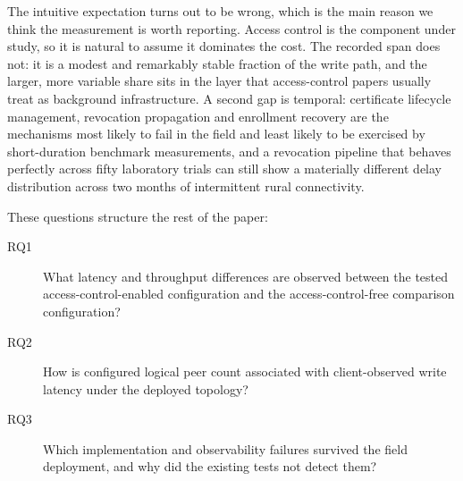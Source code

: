 \documentclass[a4paper,fleqn]{cas-sc}
\begin{document}
The intuitive expectation turns out to be wrong, which is the main reason we
think the measurement is worth reporting. Access control is the component
under study, so it is natural to assume it dominates the cost. The recorded
span does not: it is a modest and remarkably stable fraction of the write
path, and the larger, more variable share sits in the layer that
access-control papers usually treat as background infrastructure. A second
gap is temporal: certificate lifecycle management, revocation propagation
and enrollment recovery are the mechanisms most likely to fail in the field
and least likely to be exercised by short-duration benchmark measurements,
and a revocation pipeline that behaves perfectly across fifty laboratory
trials
can still show a materially different delay distribution across two months
of intermittent rural connectivity.

These questions structure the rest of the paper:

\begin{description}
\item[RQ1] What latency and throughput differences are observed between the
  tested access-control-enabled configuration and the access-control-free
  comparison configuration?
\item[RQ2] How is configured logical peer count associated with
  client-observed write latency under the deployed topology?
\item[RQ3] Which implementation and observability failures survived the
  field deployment, and why did the existing tests not detect them?
\end{description}
\end{document}
